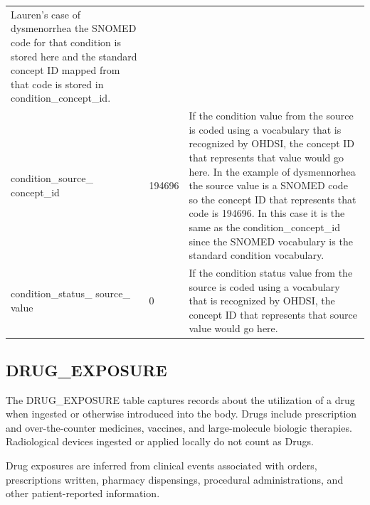 \documentclass[11pt]{book}
\begin{document}
\begin{longtable}[]{@{}lll@{}}
\begin{minipage}[t]{0.48\columnwidth}
Lauren's case of dysmenorrhea the SNOMED code for that condition is
stored here and the standard concept ID mapped from that code is stored
in condition\_concept\_id.\strut
\end{minipage}\tabularnewline
\begin{minipage}[t]{0.28\columnwidth}\raggedright\strut
condition\_source\_ concept\_id\strut
\end{minipage} & \begin{minipage}[t]{0.16\columnwidth}\raggedright\strut
194696\strut
\end{minipage} & \begin{minipage}[t]{0.48\columnwidth}\raggedright\strut
If the condition value from the source is coded using a vocabulary that
is recognized by OHDSI, the concept ID that represents that value would
go here. In the example of dysmennorhea the source value is a SNOMED
code so the concept ID that represents that code is 194696. In this case
it is the same as the condition\_concept\_id since the SNOMED vocabulary
is the standard condition vocabulary.\strut
\end{minipage}\tabularnewline
\begin{minipage}[t]{0.28\columnwidth}\raggedright\strut
condition\_status\_ source\_ value\strut
\end{minipage} & \begin{minipage}[t]{0.16\columnwidth}\raggedright\strut
0\strut
\end{minipage} & \begin{minipage}[t]{0.48\columnwidth}\raggedright\strut
If the condition status value from the source is coded using a
vocabulary that is recognized by OHDSI, the concept ID that represents
that source value would go here.\strut
\end{minipage}\tabularnewline
\bottomrule
\end{longtable}

\subsection{DRUG\_EXPOSURE}\label{drugExposure}

The DRUG\_EXPOSURE table captures records about the utilization of a
drug when ingested or otherwise introduced into the body. Drugs include
prescription and over-the-counter medicines, vaccines, and
large-molecule biologic therapies. Radiological devices ingested or
applied locally do not count as Drugs.

Drug exposures are inferred from clinical events associated with orders,
prescriptions written, pharmacy dispensings, procedural administrations,
and other patient-reported information.
\end{document}
